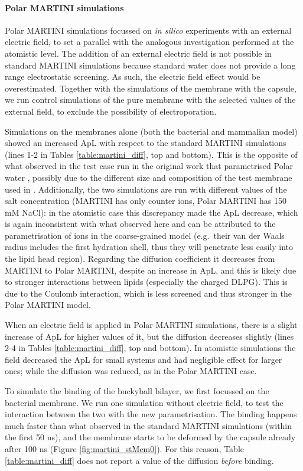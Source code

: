 \paragraph{Polar MARTINI simulations} 
Polar MARTINI simulations focussed on \emph{in silico} experiments with an external electric field, to set a parallel with the analogous investigation performed at the atomistic level. The addition of an external electric field is not possible in standard MARTINI simulations because standard water does not provide a long range electrostatic screening. As such, the electric field effect would be overestimated.
%
Together with the simulations of the membrane with the capsule, we run control simulations of the pure membrane with the selected values of the external field, to exclude the possibility of electroporation.

Simulations on the membranes alone (both the bacterial and mammalian model) showed an increased ApL with respect to the standard MARTINI simulations (lines 1-2 in Tables \ref{table:martini_diff}, top and bottom). This is the opposite of what observed in the test case run in the original work that parametrised Polar water \citep{Yesylevskyy2010}, possibly due to the different size and composition of the test membrane used in \citet{Yesylevskyy2010}.
%
Additionally, the two simulations are run with different values of the salt concentration (MARTINI has only counter ions, Polar MARTINI has 150 mM NaCl): in the atomistic case this discrepancy made the ApL decrease, which is again inconsistent with what observed here and can be attributed to the parametrisation of ions in the coarse-grained model (e.g.\ their van der Waals radius includes the first hydration shell, thus they will penetrate less easily into the lipid head region).
%
Regarding the diffusion coefficient it decreases from MARTINI to Polar MARTINI, despite an increase in ApL, and this is likely due to stronger interactions between lipids (especially the charged DLPG). This is due to the Coulomb interaction, which is less screened and thus stronger in the Polar MARTINI model.

When an electric field is applied in Polar MARTINI simulations, there is a slight increase of ApL for higher values of it, but the diffusion decreases slightly (lines 2-4 in Tables \ref{table:martini_diff}, top and bottom). In atomistic simulations the field decreased the ApL for small systems and had negligible effect for larger ones; while the diffusion was reduced, as in the Polar MARTINI case.

To simulate the binding of the buckyball bilayer, we first focussed on the bacterial membrane. We run one simulation without electric field, to test the interaction between the two with the new parametrisation. The binding happens much faster than what observed in the standard MARTINI simulations (within the first 50 ns), and the membrane starts to be deformed by the capsule already after 100 ns (Figure \ref{fig:martini_stMem0}). For this reason, Table \ref{table:martini_diff} does not report a value of the diffusion \emph{before} binding.

